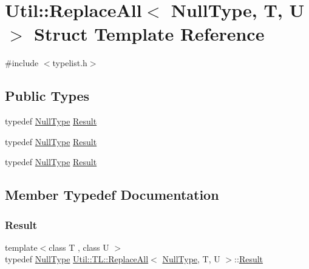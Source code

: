 \hypertarget{structUtil_1_1TL_1_1ReplaceAll_3_01NullType_00_01T_00_01U_01_4}{}\section{Util\+:\+:Replace\+All$<$ Null\+Type, T, U $>$ Struct Template Reference}
\label{structUtil_1_1TL_1_1ReplaceAll_3_01NullType_00_01T_00_01U_01_4}


{\ttfamily \#include $<$typelist.\+h$>$}

\subsection*{Public Types}
\begin{DoxyCompactItemize}
\item 
typedef \mbox{\hyperlink{classUtil_1_1NullType}{Null\+Type}} \mbox{\hyperlink{structUtil_1_1TL_1_1ReplaceAll_3_01NullType_00_01T_00_01U_01_4_aa55fd49700fa3811cad906ae93201843}{Result}}
\item 
typedef \mbox{\hyperlink{classUtil_1_1NullType}{Null\+Type}} \mbox{\hyperlink{structUtil_1_1TL_1_1ReplaceAll_3_01NullType_00_01T_00_01U_01_4_aa55fd49700fa3811cad906ae93201843}{Result}}
\item 
typedef \mbox{\hyperlink{classUtil_1_1NullType}{Null\+Type}} \mbox{\hyperlink{structUtil_1_1TL_1_1ReplaceAll_3_01NullType_00_01T_00_01U_01_4_aa55fd49700fa3811cad906ae93201843}{Result}}
\end{DoxyCompactItemize}


\subsection{Member Typedef Documentation}
\mbox{\label{structUtil_1_1TL_1_1ReplaceAll_3_01NullType_00_01T_00_01U_01_4_aa55fd49700fa3811cad906ae93201843}} 
\subsubsection{\texorpdfstring{Result}{Result}\hspace{0.1cm}{\footnotesize\ttfamily [1/3]}}
{\footnotesize\ttfamily template$<$class T , class U $>$ \\
typedef \mbox{\hyperlink{classUtil_1_1NullType}{Null\+Type}} \mbox{\hyperlink{structUtil_1_1TL_1_1ReplaceAll}{Util\+::\+T\+L\+::\+Replace\+All}}$<$ \mbox{\hyperlink{classUtil_1_1NullType}{Null\+Type}}, T, U $>$\+::\mbox{\hyperlink{structUtil_1_1TL_1_1ReplaceAll_3_01NullType_00_01T_00_01U_01_4_aa55fd49700fa3811cad906ae93201843}{Result}}}

